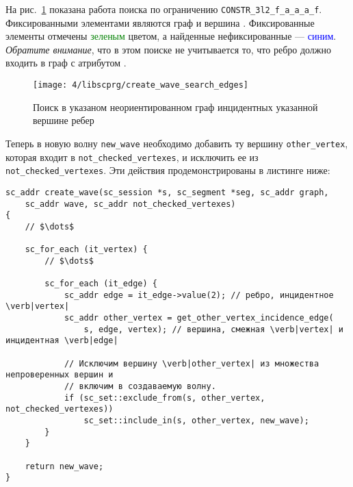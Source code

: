 На рис.~\ref{fig:create_wave_search_edges} показана работа поиска по
ограничению \lstinline|CONSTR_3l2_f_a_a_a_f|. Фиксированными
элементами являются граф  и вершина . Фиксированные
элементы отмечены \textcolor{green}{зеленым} цветом, а найденные
нефиксированные --- \textcolor{blue}{синим}. \emph{Обратите внимание},
что в этом поиске не учитывается то, что ребро должно входить в граф с
атрибутом .
\begin{figure}[h!]
  \centering
  \texttt{[image: 4/libscprg/create\_wave\_search\_edges]}
  \caption{Поиск в указаном неориентированном граф инцидентных указанной вершине ребер}
  \label{fig:create_wave_search_edges}
\end{figure}

Теперь в новую волну \lstinline|new_wave| необходимо добавить ту
вершину \lstinline|other_vertex|, которая входит в
\lstinline|not_checked_vertexes|, и исключить ее из
\lstinline|not_checked_vertexes|. Эти действия продемонстрированы в
листинге ниже:
\begin{lstlisting}[texcl]
sc_addr create_wave(sc_session *s, sc_segment *seg, sc_addr graph,
    sc_addr wave, sc_addr not_checked_vertexes)
{
    // $\dots$

    sc_for_each (it_vertex) {
        // $\dots$

        sc_for_each (it_edge) {
            sc_addr edge = it_edge->value(2); // ребро, инцидентное  \verb|vertex|
            sc_addr other_vertex = get_other_vertex_incidence_edge(
                s, edge, vertex); // вершина, смежная \verb|vertex| и инцидентная \verb|edge|

            // Исключим вершину \verb|other_vertex| из множества непроверенных вершин и
            // включим в создаваемую волну.
            if (sc_set::exclude_from(s, other_vertex, not_checked_vertexes))
                sc_set::include_in(s, other_vertex, new_wave);
        }
    }

    return new_wave;
}
\end{lstlisting}

